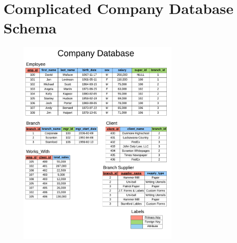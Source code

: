 \section{Complicated Company Database Schema}
\begin{figure}[H]
    \centering
    \includegraphics[width=0.7\textwidth]{Classes/company-database.pdf}
\end{figure}


